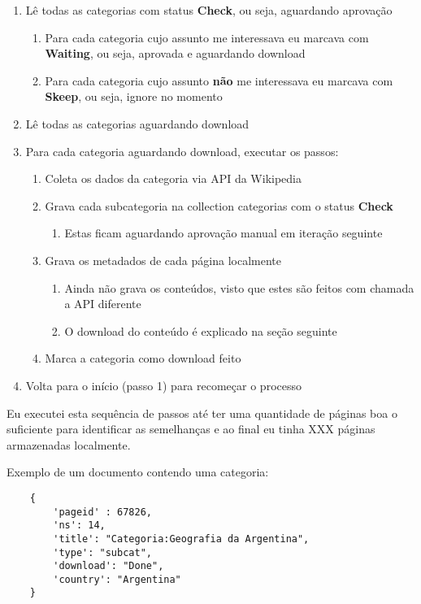 \begin{enumerate}
    \item Lê todas as categorias com status \textbf{Check}, ou seja, aguardando aprovação
    \begin{enumerate}
        \item Para cada categoria cujo assunto me interessava eu marcava com \textbf{Waiting}, ou seja, aprovada e aguardando download
        \item Para cada categoria cujo assunto \textbf{não} me interessava eu marcava com \textbf{Skeep}, ou seja, ignore no momento
    \end{enumerate}
    \item Lê todas as categorias aguardando download
    \item Para cada categoria aguardando download, executar os passos: 
    \begin{enumerate}
        \item Coleta os dados da categoria via API da Wikipedia
        \item Grava cada subcategoria na collection categorias com o status \textbf{Check}
        \begin{enumerate}
            \item Estas ficam aguardando aprovação manual em iteração seguinte
        \end{enumerate}
        \item Grava os metadados de cada página localmente
        \begin{enumerate}
            \item Ainda não grava os conteúdos, visto que estes são feitos com chamada a API diferente
            \item O download do conteúdo é explicado na seção seguinte
        \end{enumerate}
        \item Marca a categoria como download feito
    \end{enumerate}
    \item Volta para o início (passo 1) para recomeçar o processo
\end{enumerate}

Eu executei esta sequência de passos até ter uma quantidade de páginas boa o suficiente para identificar as semelhanças e ao final eu tinha 
XXX páginas armazenadas localmente.

Exemplo de um documento contendo uma categoria:

\begin{lstlisting}
    {
        'pageid' : 67826,
        'ns': 14,
        'title': "Categoria:Geografia da Argentina",
        'type': "subcat",
        'download': "Done",
        'country': "Argentina"
    }
\end{lstlisting}

